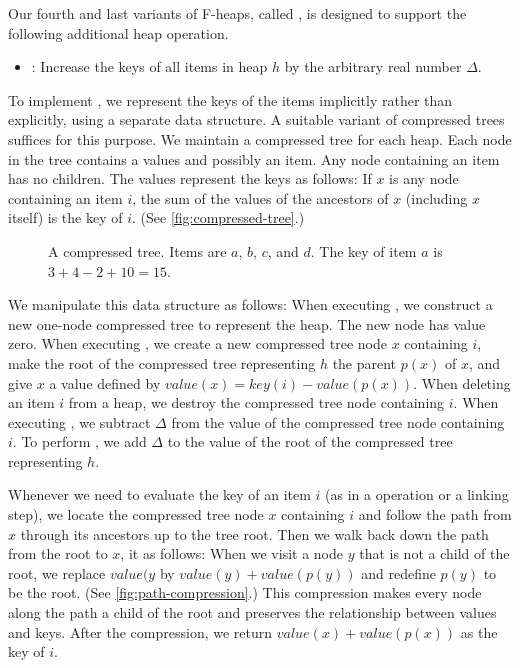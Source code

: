 Our fourth and last variants of F-heaps, called , is
designed to support the following additional heap operation.

\begin{itemize}
    \item {}: Increase the keys of all items in heap
        \(h\) by the arbitrary real number \(\Delta\).
\end{itemize}

To implement , we represent the keys of the items implicitly
rather than explicitly, using a separate data structure. A suitable variant of
compressed trees~\cite{Tarjan1979b} suffices for this purpose. We maintain
a compressed tree for each heap. Each node in the tree contains a values and possibly
an item. Any node containing an item has no children. The values represent the keys
as follows: If \(x\) is any node containing an item \(i\), the sum of the values of
the ancestors of \(x\) (including \(x\) itself) is the key of \(i\). (See
\autoref{fig:compressed-tree}.)

\begin{figure}
    \caption{A compressed tree. Items are \(a\), \(b\), \(c\), and \(d\). The key
    of item \(a\) is \(3 + 4 - 2 + 10 = 15\).}
    \label{fig:compressed-tree}
\end{figure}

We manipulate this data structure as follows: When executing , we
construct a new one-node compressed tree to represent the heap. The new node has
value zero. When executing , we create a new compressed tree
node \(x\) containing \(i\), make the root of the compressed tree representing \(h\)
the parent \(p(x)\) of \(x\), and give \(x\) a value defined by \(value(x) = key(i)
- value(p(x))\). When deleting an item \(i\) from a heap, we destroy the compressed
tree node containing \(i\). When executing , we
subtract \(\Delta\) from the value of the compressed tree node containing \(i\).  To
perform , we add \(\Delta\) to the value of the
root of the compressed tree representing \(h\).

Whenever we need to evaluate the key of an item \(i\) (as in a 
operation or a linking step), we locate the compressed tree node \(x\) containing
\(i\) and follow the path from \(x\) through its ancestors up to the tree root. Then
we walk back down the path from the root to \(x\),  it as follows:
When we visit a node \(y\) that is not a child of the root, we replace \(value(y\) by
\(value(y) + value(p(y))\) and redefine \(p(y)\) to be the root. (See
\autoref{fig:path-compression}.) This compression makes every node along the path
a child of the root and preserves the relationship between values and keys. After the
compression, we return \(value(x) + value(p(x))\) as the key of \(i\).

